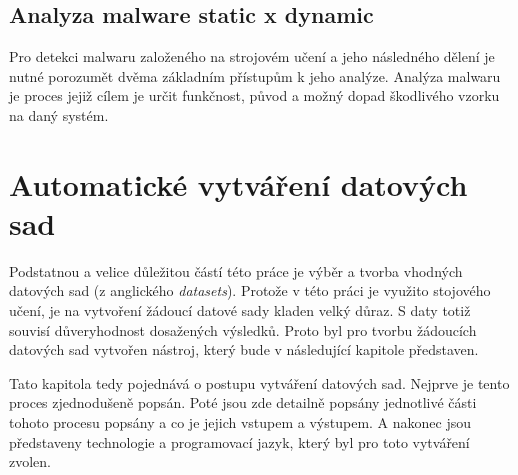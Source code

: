 \section{Analyza malware static x dynamic}
Pro detekci malwaru založeného na strojovém učení a jeho následného dělení je nutné porozumět dvěma základním přístupům k jeho analýze. Analýza malwaru je proces jejiž cílem je určit funkčnost, původ a možný dopad škodlivého vzorku na daný systém.
\newpage

\chapter{Automatické vytváření datových sad} \label{3.chap}

Podstatnou a velice důležitou částí této práce je výběr a tvorba vhodných datových sad (z anglického \textit{datasets}).
Protože v této práci je využito stojového učení, je na vytvoření žádoucí datové sady kladen velký důraz. 
S daty totiž souvisí důveryhodnost dosažených výsledků.
Proto byl pro tvorbu žádoucích datových sad vytvořen nástroj, který bude v následující kapitole představen. 

Tato kapitola tedy pojednává o postupu vytváření datových sad. Nejprve je tento proces zjednodušeně popsán.
Poté jsou zde detailně popsány jednotlivé části tohoto procesu popsány a co je jejich vstupem a výstupem.
A nakonec jsou představeny technologie a programovací jazyk, který byl pro toto vytváření zvolen. 


